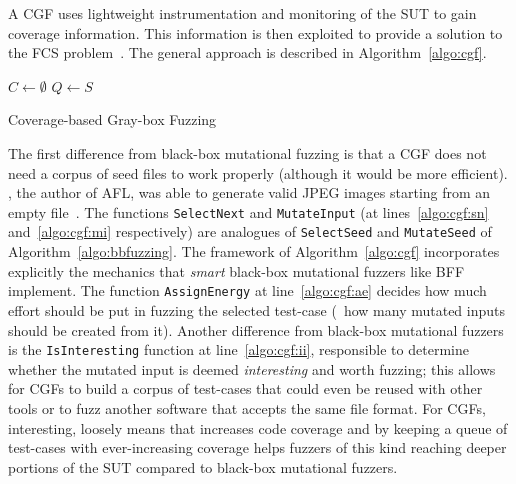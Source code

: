 A \ac{CGF} uses lightweight instrumentation and monitoring of the \ac{SUT} to
gain coverage information. This information is then exploited to provide a
solution to the \ac{FCS}
problem~\cite{afltech,lemieux2017fairfuzz,bohme2017directed,bohme2017coverage}.
The general approach is described in Algorithm~\ref{algo:cgf}.

\begin{algorithm}
    \DontPrintSemicolon%
    \BlankLine%
    $C \leftarrow \emptyset$\;
    $Q \leftarrow S$\;
    \caption{Coverage-based Gray-box Fuzzing}
\label{algo:cgf}
\end{algorithm}

The first difference from black-box mutational fuzzing is that a \ac{CGF} does
not need a corpus of seed files to work properly (although it would be more
efficient). \citeauthor{afl}, the author of AFL, was able to generate valid JPEG
images starting from an empty file~\cite{afljpeg}. The functions
\texttt{SelectNext} and \texttt{MutateInput} (at lines~\ref{algo:cgf:sn}
and~\ref{algo:cgf:mi} respectively) are analogues of \texttt{SelectSeed} and
\texttt{MutateSeed} of Algorithm~\ref{algo:bbfuzzing}. The framework of
Algorithm~\ref{algo:cgf} incorporates explicitly the mechanics that \emph{smart}
black-box mutational fuzzers like \ac{BFF} implement. The function
\texttt{AssignEnergy} at line~\ref{algo:cgf:ae} decides how much effort should
be put in fuzzing the selected test-case (\eg~how many mutated inputs should be
created from it). Another difference from black-box mutational fuzzers is the
\texttt{IsInteresting} function at line~\ref{algo:cgf:ii}, responsible to
determine whether the mutated input is deemed \emph{interesting} and worth
fuzzing; this allows for \acp{CGF} to build a corpus of test-cases that could
even be reused with other tools or to fuzz another software that accepts the
same file format. For \acp{CGF}, interesting, loosely means that increases code
coverage and by keeping a queue of test-cases with ever-increasing coverage
helps fuzzers of this kind reaching deeper portions of the \ac{SUT} compared to
black-box mutational fuzzers.

